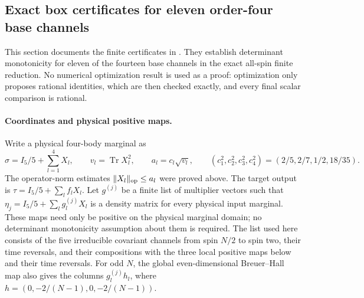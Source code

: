 \documentclass[11pt,a4paper]{article}
\begin{document}
\subsection{Exact box certificates for eleven order-four base channels}
This section documents the finite certificates in
.
They establish determinant monotonicity for eleven of the fourteen base
channels in the exact all-spin finite reduction. No numerical optimization
result is used as a proof: optimization only proposes rational identities,
which are then checked exactly, and every final scalar comparison is rational.

\paragraph{Coordinates and physical positive maps.}
Write a physical four-body marginal as
\[
 \sigma=I_5/5+\sum_{l=1}^4X_l,\qquad
 v_l=\operatorname{Tr}X_l^2,\qquad a_l=c_l\sqrt{v_l},\qquad
 (c_1^2,c_2^2,c_3^2,c_4^2)=(2/5,2/7,1/2,18/35).
\]
The operator-norm estimates $\|X_l\|_{\rm op}\le a_l$ were proved above.
The target output is $\tau=I_5/5+\sum_l f_lX_l$.
Let $g^{(j)}$ be a finite list of multiplier vectors such that
$\eta_j=I_5/5+\sum_lg_l^{(j)}X_l$ is a density matrix for every physical
input marginal. These maps need only be positive on the physical marginal
domain; no determinant monotonicity assumption about them is required.
The list used here consists of the five irreducible covariant channels
from spin $N/2$ to spin two, their time reversals, and their compositions
with the three local positive maps below and their time reversals.
For odd $N$, the global even-dimensional Breuer--Hall map also gives the
columns $g_l^{(j)}h_l$, where
$h=(0,-2/(N-1),0,-2/(N-1))$.
\end{document}
